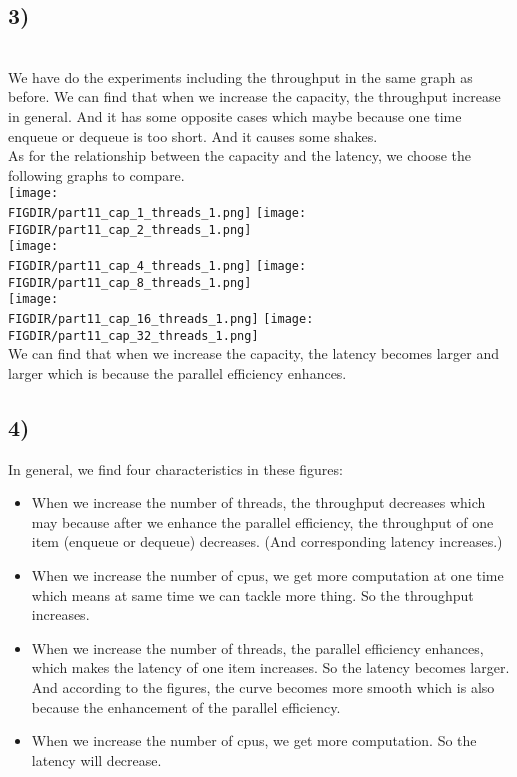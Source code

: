 \documentclass{article}
\newcommand{\FIGDIR}{} %
\begin{document}
\begin{spacing}{1.1}
\subsection*{3)}
\\We have do the experiments including the throughput in the same graph as before. We can find that when we increase the capacity, the throughput increase in general. And it has some opposite cases which maybe because one time enqueue or dequeue is too short. And it causes some shakes. 
\\\indent As for the relationship between the capacity and the latency, we choose the following graphs to compare.
\\\texttt{[image: \\FIGDIR/part11\_cap\_1\_threads\_1.png]}
\texttt{[image: \\FIGDIR/part11\_cap\_2\_threads\_1.png]}
\newpage
\\\texttt{[image: \\FIGDIR/part11\_cap\_4\_threads\_1.png]}
\texttt{[image: \\FIGDIR/part11\_cap\_8\_threads\_1.png]}
\\\texttt{[image: \\FIGDIR/part11\_cap\_16\_threads\_1.png]}
\texttt{[image: \\FIGDIR/part11\_cap\_32\_threads\_1.png]}
\\\indent We can find that when we increase the capacity, the latency becomes larger and larger which is because the parallel efficiency enhances.

\subsection*{4)}
\indent In general, we find four characteristics in these figures:
\begin{itemize}
    \item When we increase the number of threads, the throughput decreases which may because after we enhance the parallel efficiency, the throughput of one item (enqueue or dequeue) decreases. (And corresponding latency increases.)
    \item When we increase the number of cpus, we get more computation at one time which means at same time we can tackle more thing. So the throughput increases.
    \item When we increase the number of threads, the parallel efficiency enhances, which makes the latency of one item increases. So the latency becomes larger. And according to the figures, the curve becomes more smooth which is also because the enhancement of the parallel efficiency.
    \item When we increase the number of cpus, we get more computation. So the latency will decrease.
\end{itemize}


\end{spacing}
\end{document}
